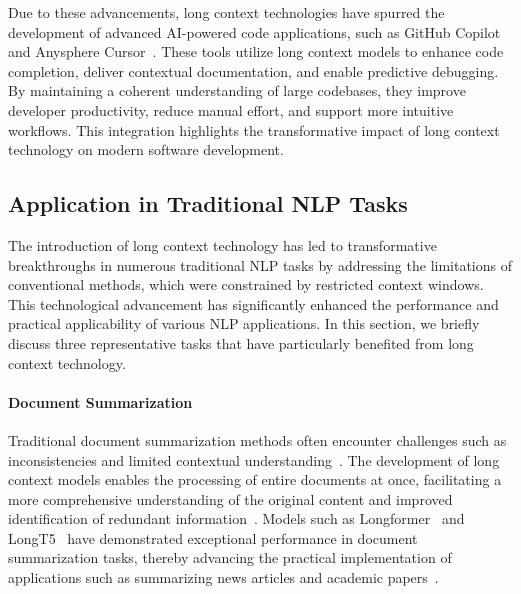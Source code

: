 \documentclass[11pt, a4paper, logo, copyright, nonumbering]{map}
\begin{document}
Due to these advancements, long context technologies have spurred the development of advanced AI-powered code applications, such as GitHub Copilot~\cite{github_copilot} and Anysphere Cursor~\cite{cursor_ai_2025}. These tools utilize long context models to enhance code completion, deliver contextual documentation, and enable predictive debugging. By maintaining a coherent understanding of large codebases, they improve developer productivity, reduce manual effort, and support more intuitive workflows. This integration highlights the transformative impact of long context technology on modern software development.


\subsection{Application in Traditional NLP Tasks}
The introduction of long context technology has led to transformative breakthroughs in numerous traditional NLP tasks by addressing the limitations of conventional methods, which were constrained by restricted context windows. This technological advancement has significantly enhanced the performance and practical applicability of various NLP applications. In this section, we briefly discuss three representative tasks that have particularly benefited from long context technology.

\paragraph{Document Summarization}
Traditional document summarization methods often encounter challenges such as inconsistencies and limited contextual understanding~\cite{zhang2019hibertdocumentlevelpretraining,zhang2020pegasus}. The development of long context models enables the processing of entire documents at once, facilitating a more comprehensive understanding of the original content and improved identification of redundant information~\cite{zaheer2020big,wang2024study,godbole2024leveraging}. Models such as Longformer~\cite{DBLP:journals/corr/abs-2004-05150} and LongT5~\cite{DBLP:conf/naacl/GuoAUONSY22} have demonstrated exceptional performance in document summarization tasks, thereby advancing the practical implementation of applications such as summarizing news articles and academic papers~\cite{jin2024comprehensive}.
\end{document}
